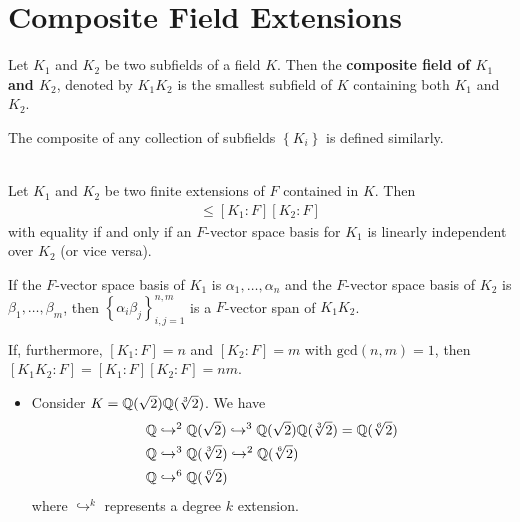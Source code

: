 \documentclass{memoir}
\begin{document}


\section{Composite Field Extensions}
\label{sec:composite_field_extensions}

\begin{defn}
	Let \(K_1\) and \(K_2\) be two subfields of a field \(K\). Then the \textbf{composite field of \(K_1\) and \(K_2\)}, denoted by \(K_1K_2\) is the smallest subfield of \(K\) containing both \(K_1\) and \(K_2\).
\end{defn}
The composite of any collection of subfields \(\left\{ K_i \right\} \) is defined similarly.\\\

\begin{prop}
	Let \(K_1\) and \(K_2\) be two finite extensions of \(F\) contained in \(K\). Then
	\begin{align*}
		[K_1K_2:F] \leq [K_1:F][K_2:F]
	\end{align*}
	with equality if and only if an \(F\)-vector space basis for \(K_1\) is linearly independent over \(K_2\) (or vice versa).
\end{prop}
If the \(F\)-vector space basis of \(K_1\) is \(\alpha_1,\ldots,\alpha_n\) and the \(F\)-vector space basis of \(K_2\) is \(\beta_1,\ldots,\beta_m\), then \(\left\{ \alpha_i \beta_j \right\}_{i,j = 1}^{n,m}\) is a \(F\)-vector span of \(K_1K_2\).
\begin{cor}
	If, furthermore, \([K_1:F] = n\) and \([K_2:F] = m\) with \(\textrm{gcd}(n,m) = 1\), then \([K_1K_2:F] = [K_1:F][K_2:F] = nm\).
\end{cor}

\begin{exmp}
	\begin{itemize}
		\item Consider \(K = \mathbb{Q}(\sqrt{2} )\mathbb{Q}(\sqrt[3]{2}) \). We have
			\begin{align*}
				\mathbb{Q} &\hookrightarrow^{2} \mathbb{Q}(\sqrt{2} ) \hookrightarrow^{3} \mathbb{Q}(\sqrt{2})\mathbb{Q}(\sqrt[3]{2}) = \mathbb{Q}(\sqrt[6]{2})\\
				\mathbb{Q} &\hookrightarrow^{3} \mathbb{Q}(\sqrt[3]{2}) \hookrightarrow^{2} \mathbb{Q}(\sqrt[6]{2})\\
				\mathbb{Q} &\hookrightarrow^{6} \mathbb{Q}(\sqrt[6]{2})
			\end{align*}
			where \(\hookrightarrow^{k}\) represents a degree \(k\) extension. %
	\end{itemize}
\end{exmp}
\end{document}
